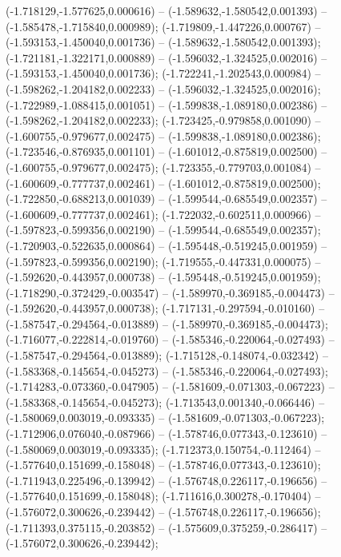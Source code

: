  (-1.718129,-1.577625,0.000616) -- (-1.589632,-1.580542,0.001393) -- (-1.585478,-1.715840,0.000989);
 (-1.719809,-1.447226,0.000767) -- (-1.593153,-1.450040,0.001736) -- (-1.589632,-1.580542,0.001393);
 (-1.721181,-1.322171,0.000889) -- (-1.596032,-1.324525,0.002016) -- (-1.593153,-1.450040,0.001736);
 (-1.722241,-1.202543,0.000984) -- (-1.598262,-1.204182,0.002233) -- (-1.596032,-1.324525,0.002016);
 (-1.722989,-1.088415,0.001051) -- (-1.599838,-1.089180,0.002386) -- (-1.598262,-1.204182,0.002233);
 (-1.723425,-0.979858,0.001090) -- (-1.600755,-0.979677,0.002475) -- (-1.599838,-1.089180,0.002386);
 (-1.723546,-0.876935,0.001101) -- (-1.601012,-0.875819,0.002500) -- (-1.600755,-0.979677,0.002475);
 (-1.723355,-0.779703,0.001084) -- (-1.600609,-0.777737,0.002461) -- (-1.601012,-0.875819,0.002500);
 (-1.722850,-0.688213,0.001039) -- (-1.599544,-0.685549,0.002357) -- (-1.600609,-0.777737,0.002461);
 (-1.722032,-0.602511,0.000966) -- (-1.597823,-0.599356,0.002190) -- (-1.599544,-0.685549,0.002357);
 (-1.720903,-0.522635,0.000864) -- (-1.595448,-0.519245,0.001959) -- (-1.597823,-0.599356,0.002190);
 (-1.719555,-0.447331,0.000075) -- (-1.592620,-0.443957,0.000738) -- (-1.595448,-0.519245,0.001959);
 (-1.718290,-0.372429,-0.003547) -- (-1.589970,-0.369185,-0.004473) -- (-1.592620,-0.443957,0.000738);
 (-1.717131,-0.297594,-0.010160) -- (-1.587547,-0.294564,-0.013889) -- (-1.589970,-0.369185,-0.004473);
 (-1.716077,-0.222814,-0.019760) -- (-1.585346,-0.220064,-0.027493) -- (-1.587547,-0.294564,-0.013889);
 (-1.715128,-0.148074,-0.032342) -- (-1.583368,-0.145654,-0.045273) -- (-1.585346,-0.220064,-0.027493);
 (-1.714283,-0.073360,-0.047905) -- (-1.581609,-0.071303,-0.067223) -- (-1.583368,-0.145654,-0.045273);
 (-1.713543,0.001340,-0.066446) -- (-1.580069,0.003019,-0.093335) -- (-1.581609,-0.071303,-0.067223);
 (-1.712906,0.076040,-0.087966) -- (-1.578746,0.077343,-0.123610) -- (-1.580069,0.003019,-0.093335);
 (-1.712373,0.150754,-0.112464) -- (-1.577640,0.151699,-0.158048) -- (-1.578746,0.077343,-0.123610);
 (-1.711943,0.225496,-0.139942) -- (-1.576748,0.226117,-0.196656) -- (-1.577640,0.151699,-0.158048);
 (-1.711616,0.300278,-0.170404) -- (-1.576072,0.300626,-0.239442) -- (-1.576748,0.226117,-0.196656);
 (-1.711393,0.375115,-0.203852) -- (-1.575609,0.375259,-0.286417) -- (-1.576072,0.300626,-0.239442);

